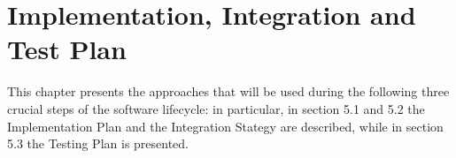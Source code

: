 \chapter{Implementation, Integration and Test Plan}
This chapter presents the approaches that will be used during the following three crucial steps of the software lifecycle: in particular, in section 5.1 and 5.2 the Implementation Plan and the Integration Stategy are described, while in section 5.3 the Testing Plan is presented.




